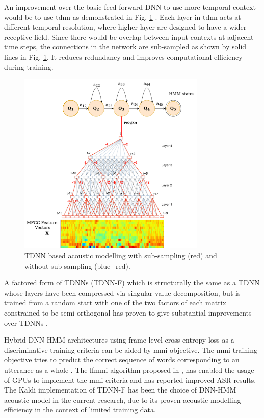 An improvement over the basic feed forward DNN to use more temporal context would be to use \gls{tdnn} as demonstrated in Fig. \ref{fig:tdnn} \cite{peddinti2015time}. Each layer in \gls{tdnn} acts at different temporal resolution, where higher layer are designed to have a wider receptive field. 
Since there would be overlap between input contexts at adjacent time steps, the connections in the network are sub-sampled as shown by solid lines in Fig. \ref{fig:tdnn}. It reduces redundancy and improves computational efficiency during training.


\begin{figure}[ht]
	\begin{center}
		\includegraphics[width=0.8\textwidth]{tdnn.png}
		\caption{TDNN based acoustic modelling with sub-sampling (red) and without sub-sampling (blue+red).}
		\label{fig:tdnn}
	\end{center}
\end{figure}



A factored form of TDNNs (TDNN-F) which is structurally the same as a TDNN whose layers have been compressed via singular value decomposition, but is trained from a random start with one of the two factors of each matrix constrained to be semi-orthogonal has proven to give substantial improvements over TDNNs \cite{povey18_interspeech}. 


Hybrid DNN-HMM architectures using frame level cross entropy loss as a
discriminative training criteria can be aided by \gls{mmi} objective.
The \gls{mmi} training objective tries to predict the correct sequence of words
corresponding to an utterance as a whole \cite{vesely2013sequence}. The
\gls{lfmmi} algorithm proposed in \cite{povey2016purely}, has enabled the usage
of GPUs to implement the \gls{mmi} criteria and has reported improved ASR
results. The Kaldi implementation of TDNN-F has been the choice of DNN-HMM acoustic model in the current research, due to its proven acoustic modelling efficiency in the context of limited training data.


